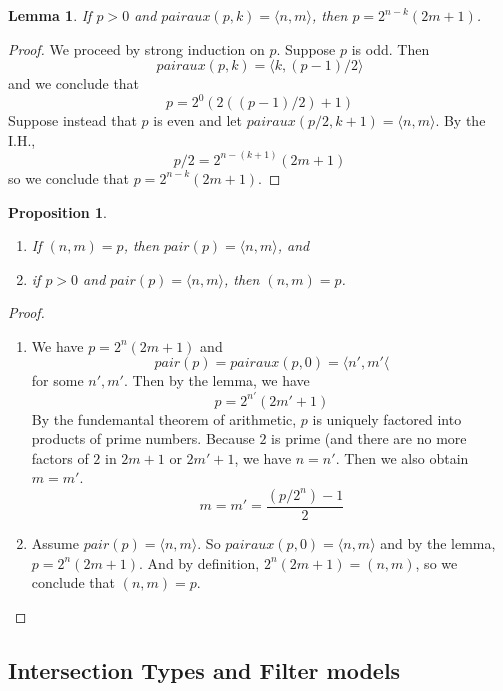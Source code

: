 \documentclass{tufte-handout}
\newtheorem{lemma}[theorem]{Lemma}
\newtheorem{proposition}[theorem]{Proposition}
\begin{document}
\begin{lemma}
  If $p > 0$ and $\mathit{pairaux}(p,k) = \langle n, m\rangle$,
  then $p = 2^{n - k}(2m + 1)$.
\end{lemma}
\begin{proof}
We proceed by strong induction on $p$.
Suppose $p$ is odd.
Then
\[
  \mathit{pairaux}(p,k) = \langle k, (p-1)/2\rangle
\]
and we conclude that
\[
  p = 2^0 (2 ((p - 1)/2) + 1)
\]
Suppose instead that $p$ is even and
let $\mathit{pairaux}(p/2,k+1) = \langle n, m\rangle$.
By the I.H., 
\[
p/2 = 2^{n-(k+1)}(2m + 1)
\]
so we conclude that $p = 2^{n-k}(2m + 1)$.

\end{proof}

\begin{proposition}\ 
\begin{enumerate}
\item If $(n,m) = p$, then $\mathit{pair}(p) = \langle n,m \rangle$, and
\item if $p > 0$ and $\mathit{pair}(p) = \langle n,m \rangle$, then $(n,m) = p$.
\end{enumerate}
\end{proposition}
\begin{proof}\ 
\begin{enumerate}
\item We have $p=2^n(2m+1)$ and
  \[
    \mathit{pair}(p) = \mathit{pairaux}(p,0) = \langle n', m' \langle
  \]
  for some $n',m'$. Then by the lemma, we have
  \[
  p = 2^{n'}(2m' + 1)
  \]
  By the fundemantal theorem of arithmetic, $p$ is uniquely factored
  into products of prime numbers. Because $2$ is prime (and there are
  no more factors of $2$ in $2m+1$ or $2m'+1$, we have $n = n'$.
  Then we also obtain $m = m'$.
  \[
      m = m' = \frac{(p/2^n) -1}{2}
  \]
  
\item Assume $\mathit{pair}(p) = \langle n, m \rangle$.
  So $\mathit{pairaux}(p,0) = \langle n, m \rangle$ and by the lemma,
  $p = 2^n(2m+1)$. And by definition, $2^n(2m+1) = (n,m)$,
  so we conclude that $(n,m) = p$.
\end{enumerate}
\end{proof}









\subsection{Intersection Types and Filter models}
\label{sec:filter-models}
\end{document}
